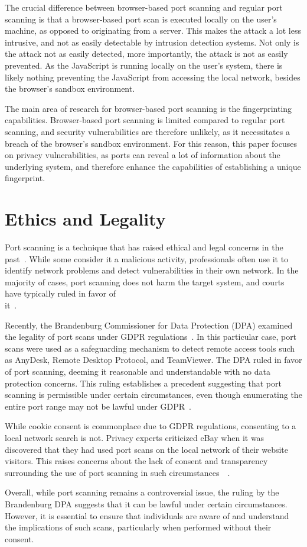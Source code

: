 The crucial difference between browser-based port scanning and regular port scanning is that a browser-based port scan is executed locally on the user's machine, as opposed to originating from a server. 
This makes the attack a lot less intrusive, and not as easily detectable by intrusion detection systems. 
Not only is the attack not as easily detected, more importantly, the attack is not as easily prevented.
As the JavaScript is running locally on the user's system, there is likely nothing preventing the JavaScript from accessing the local network, besides the browser's sandbox environment.

The main area of research for browser-based port scanning is the fingerprinting capabilities. 
Browser-based port scanning is limited compared to regular port scanning, and security vulnerabilities are therefore unlikely, as it necessitates a breach of the browser's sandbox environment. For this reason, this paper focuses on privacy vulnerabilities, as ports can reveal a lot of information about the underlying system, and therefore enhance the capabilities of establishing a unique fingerprint.


\section{Ethics and Legality}
Port scanning is a technique that has raised ethical and legal concerns in the past~\cite{jamieson2001}. While some consider it a malicious activity, professionals often use it to identify network problems and detect vulnerabilities in their own network. In the majority of cases, port scanning does not harm the target system, and courts have typically ruled in favor of \\ it~\cite{Lyon2009}.

Recently, the Brandenburg Commissioner for Data Protection (DPA) examined the legality of port scans under GDPR regulations~\cite{gdpr}. In this particular case, port scans were used as a safeguarding mechanism to detect remote access tools such as AnyDesk, Remote Desktop Protocol, and TeamViewer. The DPA ruled in favor of port scanning, deeming it reasonable and understandable with no data protection concerns. This ruling establishes a precedent suggesting that port scanning is permissible under certain circumstances, even though enumerating the entire port range may not be lawful under GDPR~\cite{edpb_decision}.

While cookie consent is commonplace due to GDPR regulations, consenting to a local network search is not. Privacy experts criticized eBay when it was discovered that they had used port scans on the local network of their website visitors. This raises concerns about the lack of consent and transparency surrounding the use of port scanning in such circumstances~\cite{ebay_port_scans}~\cite{forbes_ebay}.

Overall, while port scanning remains a controversial issue, the ruling by the Brandenburg DPA suggests that it can be lawful under certain circumstances. However, it is essential to ensure that individuals are aware of and understand the implications of such scans, particularly when performed without their consent.